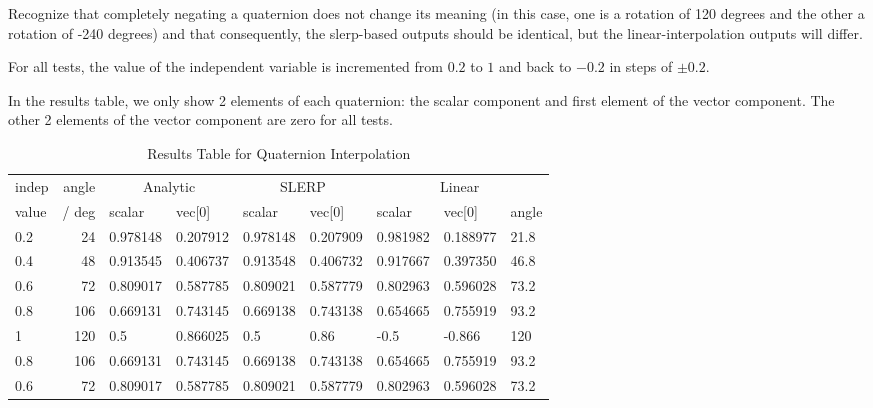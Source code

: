 \documentclass[11pt,fleqn]{report}
\begin{document}
Recognize that completely negating a quaternion does not change its meaning
(in this case, one is a rotation of 120 degrees and the other a rotation of
-240 degrees) and that consequently, the slerp-based outputs should be
identical, but the linear-interpolation outputs will differ.

For all tests, the value of the independent variable is incremented from $0.2$
to $1$ and back to $-0.2$ in steps of $\pm0.2$.

In the results table, we only show 2 elements of each quaternion: the scalar
component and first element of the vector component.  The other 2 elements
of the vector component are zero for all tests.

\begin{table}
\caption{Results Table for Quaternion Interpolation}
\begin{center}
\begin{tabular}{||l||r||l|l||l|l||l|l|l||}
\hline \hline

indep& angle &
\multicolumn{2}{c||}{Analytic} &
\multicolumn{2}{c||}{SLERP} &
\multicolumn{3}{c||}{Linear} \\

value  & / deg &
scalar & vec[0] &
scalar & vec[0] &
scalar & vec[0] & angle \\


\hline \hline
 0.2  &  24 &
 0.978148 & 0.207912 &
 0.978148 & 0.207909 &
 0.981982 & 0.188977 & 21.8 \\ \hline

 0.4  &  48 &
 0.913545 & 0.406737 &
 0.913548 & 0.406732 &
 0.917667 & 0.397350 & 46.8 \\ \hline

 0.6  &  72 &
 0.809017 & 0.587785 &
 0.809021 & 0.587779 &
 0.802963 & 0.596028 & 73.2 \\ \hline

 0.8  & 106 &
 0.669131 & 0.743145 &
 0.669138 & 0.743138 &
 0.654665 & 0.755919 & 93.2 \\ \hline

 1    & 120 &
 0.5                & 0.866025  &
 0.5                & 0.86      &
 -0.5               & -0.866    &120   \\ \hline

 0.8  & 106 &
 0.669131  & 0.743145  &
 0.669138  & 0.743138  &
 0.654665  & 0.755919  & 93.2 \\ \hline

 0.6  &  72 &
 0.809017 & 0.587785 &
 0.809021 & 0.587779 &
 0.802963 & 0.596028 & 73.2 \\ \hline


\end{tabular}
\end{center}
\end{table}
\end{document}
